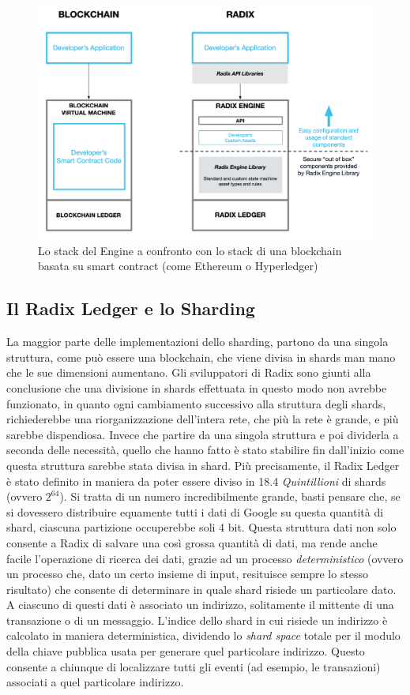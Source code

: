 \begin{figure}[H]
    \includegraphics[width=\linewidth]{images/radix-engine-2.png}
    \caption{Lo stack del Engine a confronto con lo stack di una blockchain basata su smart contract (come Ethereum o Hyperledger)}
    \label{fig:my_label}
\end{figure}

\subsection{Il Radix Ledger e lo Sharding}

La maggior parte delle implementazioni dello sharding, partono da una singola struttura, come può essere una blockchain, che viene divisa in shards man mano che le sue dimensioni aumentano. Gli sviluppatori di Radix sono giunti alla conclusione che una divisione in shards effettuata in questo modo non avrebbe funzionato, in quanto ogni cambiamento successivo alla struttura degli shards, richiederebbe una riorganizzazione dell'intera rete, che più la rete è grande, e più sarebbe dispendiosa. Invece che partire da una singola struttura e poi dividerla a seconda delle necessità, quello che hanno fatto è stato stabilire fin dall'inizio come questa struttura sarebbe stata divisa in shard. 
Più precisamente, il Radix Ledger è stato definito in maniera da poter essere diviso in 18.4 \textit{Quintillioni} di shards \cite{K18} (ovvero $2^{64}$). Si tratta di un numero incredibilmente grande, basti pensare che, se si dovessero distribuire equamente tutti i dati di Google su questa quantità di shard, ciascuna partizione occuperebbe soli 4 bit. Questa struttura dati non solo consente a Radix di salvare una così grossa quantità di dati, ma rende anche facile l'operazione di ricerca dei dati, grazie ad un processo \textit{deterministico} (ovvero un processo che, dato un certo insieme di input, resituisce sempre lo stesso risultato) che consente di determinare in quale shard risiede un particolare dato. A ciascuno di questi dati è associato un indirizzo, solitamente il mittente di una transazione o di un messaggio. L'indice dello shard in cui risiede un indirizzo è calcolato in maniera deterministica, dividendo lo \textit{shard space} totale per il modulo della chiave pubblica usata per generare quel particolare indirizzo. Questo consente a chiunque di localizzare tutti gli eventi (ad esempio, le transazioni) associati a quel particolare indirizzo. 

